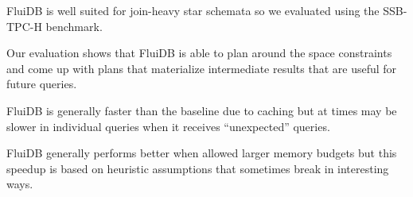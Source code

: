 
\begin{summary}
\item FluiDB is well suited for join-heavy star schemata so we
  evaluated using the SSB-TPC-H benchmark.
\item Our evaluation shows that FluiDB is able to plan around the
  space constraints and come up with plans that materialize
  intermediate results that are useful for future queries.
\item FluiDB is generally faster than the baseline due to caching but
  at times may be slower in individual queries when it receives
  ``unexpected'' queries.
\item FluiDB generally performs better when allowed larger memory
  budgets but this speedup is based on heuristic assumptions that
  sometimes break in interesting ways.
\end{summary}

